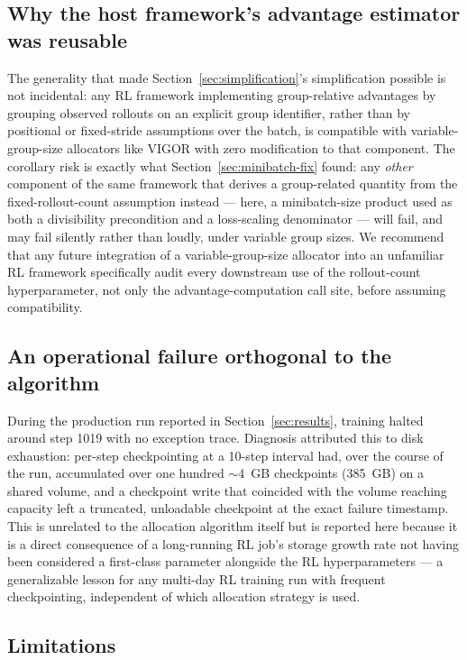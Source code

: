 \documentclass[11pt]{article}
\begin{document}
\subsection{Why the host framework's advantage estimator was reusable}

The generality that made Section~\ref{sec:simplification}'s simplification possible
is not incidental: any RL framework implementing group-relative advantages by
grouping observed rollouts on an explicit group identifier, rather than by
positional or fixed-stride assumptions over the batch, is compatible with
variable-group-size allocators like VIGOR with zero modification to that
component. The corollary risk is exactly what Section~\ref{sec:minibatch-fix}
found: any \emph{other} component of the same framework that derives a
group-related quantity from the fixed-rollout-count assumption instead — here, a
minibatch-size product used as both a divisibility precondition and a loss-scaling
denominator — will fail, and may fail silently rather than loudly, under variable
group sizes. We recommend that any future integration of a variable-group-size
allocator into an unfamiliar RL framework specifically audit every downstream use
of the rollout-count hyperparameter, not only the advantage-computation call site,
before assuming compatibility.

\subsection{An operational failure orthogonal to the algorithm}

During the production run reported in Section~\ref{sec:results}, training halted
around step 1019 with no exception trace. Diagnosis attributed this to disk
exhaustion: per-step checkpointing at a 10-step interval had, over the course of
the run, accumulated over one hundred $\sim$4~GB checkpoints (385~GB) on a shared
volume, and a checkpoint write that coincided with the volume reaching capacity
left a truncated, unloadable checkpoint at the exact failure timestamp. This is
unrelated to the allocation algorithm itself but is reported here because it is a
direct consequence of a long-running RL job's storage growth rate not having been
considered a first-class parameter alongside the RL hyperparameters — a
generalizable lesson for any multi-day RL training run with frequent
checkpointing, independent of which allocation strategy is used.

\subsection{Limitations}
\end{document}
